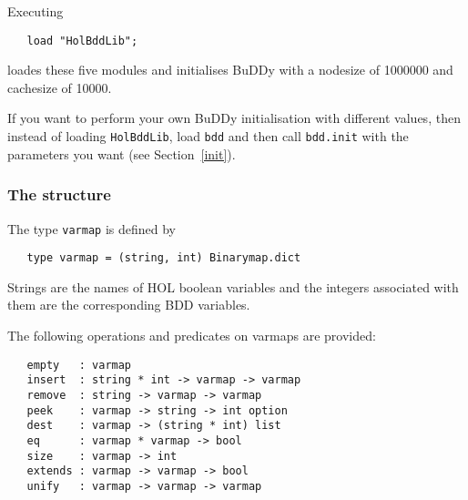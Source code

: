 \documentclass[12pt]{book}
\renewcommand{\t}[1]{\mbox{\tt #1}}
\newcommand{\Buddy}{BuDDy{}}
\begin{document}
Executing

\vspace*{-2mm}

\begin{verbatim}
   load "HolBddLib";
\end{verbatim}

\vspace*{-2mm}

loades these five modules and
initialises \Buddy{} with a nodesize of 1000000
and cachesize of 10000.  

If you want to perform your own \Buddy{} initialisation with different
values, then instead of loading \t{HolBddLib}, load \t{bdd} and then
call \t{bdd.init} with the parameters you want (see Section~\ref{init}).  

\subsubsection{The structure }\label{Varmap}

The type \t{varmap} is defined by

\vspace*{-2mm}

\begin{verbatim}
   type varmap = (string, int) Binarymap.dict
\end{verbatim}

\vspace*{-2mm}

Strings are the names of HOL boolean variables and the integers associated with them
are the corresponding BDD variables.

The following operations and predicates on varmaps are provided:

\begin{verbatim}
   empty   : varmap
   insert  : string * int -> varmap -> varmap
   remove  : string -> varmap -> varmap
   peek    : varmap -> string -> int option
   dest    : varmap -> (string * int) list
   eq      : varmap * varmap -> bool
   size    : varmap -> int
   extends : varmap -> varmap -> bool
   unify   : varmap -> varmap -> varmap
\end{verbatim}
\end{document}
